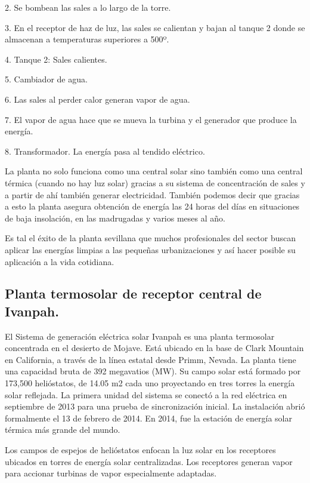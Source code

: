 2. Se bombean las sales a lo largo de la torre.

3. En el receptor de haz de luz, las sales se calientan y bajan al tanque 2 donde se almacenan a temperaturas superiores a 500º.

4. Tanque 2: Sales calientes.

5. Cambiador de agua.

6. Las sales al perder calor generan vapor de agua.

7. El vapor de agua hace que se mueva la turbina y el generador que produce la energía.

8. Transformador. La energía pasa al tendido eléctrico.

La planta no solo funciona como una central solar sino también como una central térmica (cuando no hay luz solar) gracias a su sistema de concentración de sales y a partir de ahí también generar electricidad. También podemos decir que gracias a esto la planta asegura obtención de energía las 24 horas del días en situaciones de baja insolación, en las madrugadas y varios meses al año.

Es tal el éxito de la planta sevillana que muchos profesionales del sector buscan aplicar las energías limpias a las pequeñas urbanizaciones y así hacer posible su aplicación a la vida cotidiana. \cite{PonsWebSite}



\subsection{Planta termosolar de receptor central de Ivanpah.}

El Sistema de generación eléctrica solar Ivanpah es una planta termosolar concentrada en el desierto de Mojave. Está ubicado en la base de Clark Mountain en California, a través de la línea estatal desde Primm, Nevada. La planta tiene una capacidad bruta de 392 megavatios (MW). Su campo solar está formado por 173,500 helióstatos, de 14.05 m2 cada uno proyectando en tres torres la energía solar reflejada. La primera unidad del sistema se conectó a la red eléctrica en septiembre de 2013 para una prueba de sincronización inicial. La instalación abrió formalmente el 13 de febrero de 2014. En 2014, fue la estación de energía solar térmica más grande del mundo.
 
Los campos de espejos de helióstatos enfocan la luz solar en los receptores ubicados en torres de energía solar centralizadas. Los receptores generan vapor para accionar turbinas de vapor especialmente adaptadas.
 
